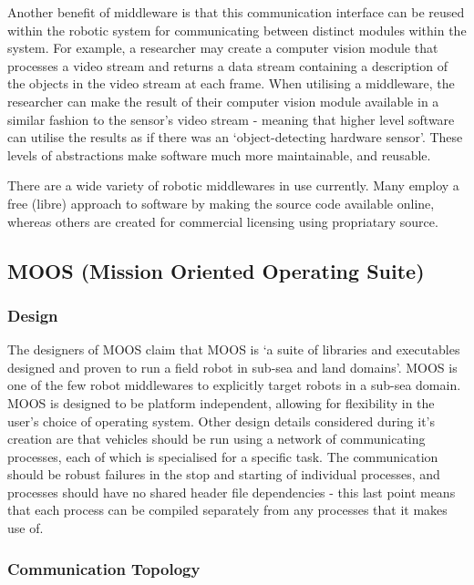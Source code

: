 \documentclass{l4proj}
\begin{document}
Another benefit of middleware is that this communication interface can be reused within the robotic system for communicating between distinct modules within the system. For example, a researcher may create a computer vision module that processes a video stream and returns a data stream containing a description of the objects in the video stream at each frame. When utilising a middleware, the researcher can make the result of their computer vision module available in a similar fashion to the sensor's video stream - meaning that higher level software can utilise the results as if there was an `object-detecting hardware sensor'. These levels of abstractions make software much more maintainable, and reusable.

There are a wide variety of robotic middlewares in use currently. Many employ a free (libre) approach to software by making the source code available online, whereas others are created for commercial licensing using propriatary source.

\subsection{MOOS (Mission Oriented Operating Suite) \cite{newman2008moos}}

\subsubsection{Design}

The designers of MOOS claim that MOOS is `a suite of libraries and executables designed and proven to run a field robot in sub-sea and land domains'\cite{newman2008moos}. MOOS is one of the few robot middlewares to explicitly target robots in a sub-sea domain. MOOS is designed to be platform independent, allowing for flexibility in the user's choice of operating system. Other design details considered during it's creation are that vehicles should be run using a network of communicating processes, each of which is specialised for a specific task. The communication should be robust failures in the stop and starting of individual processes, and processes should have no shared header file dependencies\cite{newman2008moos} - this last point means that each process can be compiled separately from any processes that it makes use of.

\subsubsection{Communication Topology}
\end{document}
